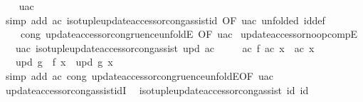 \begin{isabellebody}
%
\isadelimproof
\ \ %
\endisadelimproof
%
\isatagproof
{}\isamarkupfalse%
\ uac\isanewline
\ \ \isamarkupfalse%
\ {\isacharparenleft}{\kern0pt}simp\ add{\isacharcolon}{\kern0pt}\ ac\ iso{\isacharunderscore}{\kern0pt}tuple{\isacharunderscore}{\kern0pt}update{\isacharunderscore}{\kern0pt}accessor{\isacharunderscore}{\kern0pt}cong{\isacharunderscore}{\kern0pt}assist{\isacharunderscore}{\kern0pt}id\ {\isacharbrackleft}{\kern0pt}OF\ uac{\isacharcomma}{\kern0pt}\ unfolded\ id{\isacharunderscore}{\kern0pt}def{\isacharbrackright}{\kern0pt}\isanewline
\ \ \ \ cong{\isacharcolon}{\kern0pt}\ update{\isacharunderscore}{\kern0pt}accessor{\isacharunderscore}{\kern0pt}congruence{\isacharunderscore}{\kern0pt}unfoldE\ {\isacharbrackleft}{\kern0pt}OF\ uac{\isacharbrackright}{\kern0pt}{\isacharparenright}{\kern0pt}%
\endisatagproof
{\isafoldproof}%
%
\isadelimproof
\isanewline
%
\endisadelimproof
\isanewline
{}\isamarkupfalse%
\ update{\isacharunderscore}{\kern0pt}accessor{\isacharunderscore}{\kern0pt}noop{\isacharunderscore}{\kern0pt}compE{\isacharcolon}{\kern0pt}\isanewline
\ \ \ uac{\isacharcolon}{\kern0pt}\ {\isachardoublequoteopen}iso{\isacharunderscore}{\kern0pt}tuple{\isacharunderscore}{\kern0pt}update{\isacharunderscore}{\kern0pt}accessor{\isacharunderscore}{\kern0pt}cong{\isacharunderscore}{\kern0pt}assist\ upd\ ac{\isachardoublequoteclose}\isanewline
\ \ \ \ \ ac{\isacharcolon}{\kern0pt}\ {\isachardoublequoteopen}f\ {\isacharparenleft}{\kern0pt}ac\ x{\isacharparenright}{\kern0pt}\ {\isacharequal}{\kern0pt}\ ac\ x{\isachardoublequoteclose}\isanewline
\ \ \ {\isachardoublequoteopen}upd\ {\isacharparenleft}{\kern0pt}g\ {\isasymcirc}\ f{\isacharparenright}{\kern0pt}\ x\ {\isacharequal}{\kern0pt}\ upd\ g\ x{\isachardoublequoteclose}\isanewline
%
\isadelimproof
\ \ %
\endisadelimproof
%
\isatagproof
{}\isamarkupfalse%
\ {\isacharparenleft}{\kern0pt}simp\ add{\isacharcolon}{\kern0pt}\ ac\ cong{\isacharcolon}{\kern0pt}\ update{\isacharunderscore}{\kern0pt}accessor{\isacharunderscore}{\kern0pt}congruence{\isacharunderscore}{\kern0pt}unfoldE{\isacharbrackleft}{\kern0pt}OF\ uac{\isacharbrackright}{\kern0pt}{\isacharparenright}{\kern0pt}%
\endisatagproof
{\isafoldproof}%
%
\isadelimproof
\isanewline
%
\endisadelimproof
\isanewline
{}\isamarkupfalse%
\ update{\isacharunderscore}{\kern0pt}accessor{\isacharunderscore}{\kern0pt}cong{\isacharunderscore}{\kern0pt}assist{\isacharunderscore}{\kern0pt}idI{\isacharcolon}{\kern0pt}\isanewline
\ \ {\isachardoublequoteopen}iso{\isacharunderscore}{\kern0pt}tuple{\isacharunderscore}{\kern0pt}update{\isacharunderscore}{\kern0pt}accessor{\isacharunderscore}{\kern0pt}cong{\isacharunderscore}{\kern0pt}assist\ id\ id{\isachardoublequoteclose}\isanewline

\end{isabellebody}
